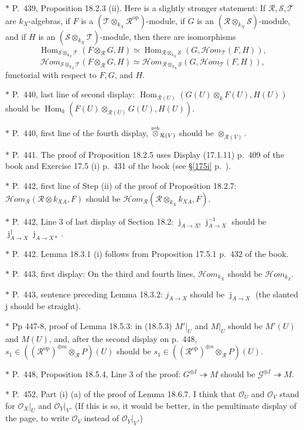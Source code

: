 \documentclass[12pt]{article}%
\theoremstyle{remark}
\theoremstyle{definition}
\newcommand{\nn}{\noindent}
\newcommand{\cc}{\mathcal}
\newcommand{\oo}{\operatorname}
\newcommand{\epi}{\twoheadrightarrow}
\newcommand{\HOM}{\cc H\!\mathit{om}}
\DeclareMathOperator{\jj}{j}
\DeclareMathOperator{\Hom}{Hom}%
\DeclareMathOperator{\op}{op}
\begin{document}
\nn$*$ P.~439, Proposition 18.2.3 (ii). Here is a slightly stronger statement: If $\cc{R,S,T}$ are $k_X$-algebras, if $F$ is a $(\cc T\otimes_{k_X}\cc R^{\op})$-module, if $G$ is an $(\cc R\otimes_{k_X}\cc S)$-module, and if $H$ is an $(\cc S\otimes_{k_X}\cc T)$-module, then there are isomorphisms 
$$
\Hom_{\cc S\otimes_{k_X}\cc T}(F\otimes_{\cc R}G,H)\simeq
\Hom_{\cc R\otimes_{k_X}\cc S}(G,\HOM_{\cc T}(F,H)), 
$$ 
$$
\HOM_{\cc S\otimes_{k_X}\cc T}(F\otimes_{\cc R}G,H)\simeq
\HOM_{\cc R\otimes_{k_X}\cc S}(G,\HOM_{\cc T}(F,H)), 
$$ 
functorial with respect to $F,G$, and $H$.

\nn$*$ P.~440, last line of second display: $\Hom_{\cc R(U)}(G(U)\otimes_kF(U),H(U))$ should be $\Hom_k(F(U)\otimes_{\cc R(U)}G(U),H(U))$. 

\nn$*$ P.~440, first line of the fourth display, $\overset{\text{\tiny psh}}{\otimes}_{\cc R(V)}$ should be $\otimes_{\cc R(V)}$. 

\nn$*$ P.~441. The proof of Proposition 18.2.5 uses Display (17.1.11) p.~409 of the book and Exercise 17.5 (i) p.~431 of the book (see \S\ref{175i} p.~\pageref{175i}).  

\nn$*$ P.~442, first line of Step (ii) of the proof of Proposition 18.2.7: $\HOM_{\cc R}(\cc R\otimes k_{XA},F)$ should be $\HOM_{\cc R}(\cc R\otimes_{k_X}k_{XA},F)$. 

\nn$*$ P.~442, Line 3 of last display of Section 18.2: $\jj_{A\to X!}\jj_{A\to X}^{-1}$ should be $\jj_{A\to X}^\ddagger\jj_{A\to X*}$. 

\nn$*$ P.~442. Lemma 18.3.1 (i) follows from Proposition 17.5.1 p.~432 of the book. 

\nn$*$ P.~443, first display: On the third and fourth lines, $\HOM_{k_X}$ should be $\HOM_{k_Z}$. 

\nn$*$ P.~443, sentence preceding Lemma 18.3.2: $j_{A\to X}$ should be $\oo j_{A\to X}$ (the slanted j should be straight). 

\nn$*$ Pp 447-8, proof of Lemma 18.5.3: in (18.5.3) $M'|_U$ and $M|_U$ should be $M'(U)$ and $M(U)$, and, after the second display on p.~448, $s_1\in((\cc R^{\op})^{\oplus m}\otimes_{\cc R}P)(U)$ should be $s_1\in((\cc R^{\op})^{\oplus n}\otimes_{\cc R}P)(U)$.

\nn$*$ P.~448, Proposition 18.5.4, Line 3 of the proof: $G^{\oplus I}\epi M$ should be $\cc G^{\oplus I}\epi M$.

\nn$*$ P.~452, Part (i) (a) of the proof of Lemma 18.6.7. I think that $\cc O_U$ and $\cc O_V$ stand for $\cc O_X|_U$ and $\cc O_Y|_V$. (If this is so, it would be better, in the penultimate display of the page, to write $\cc O_V$ instead of $\cc O_Y|_V$.) 
\end{document}
